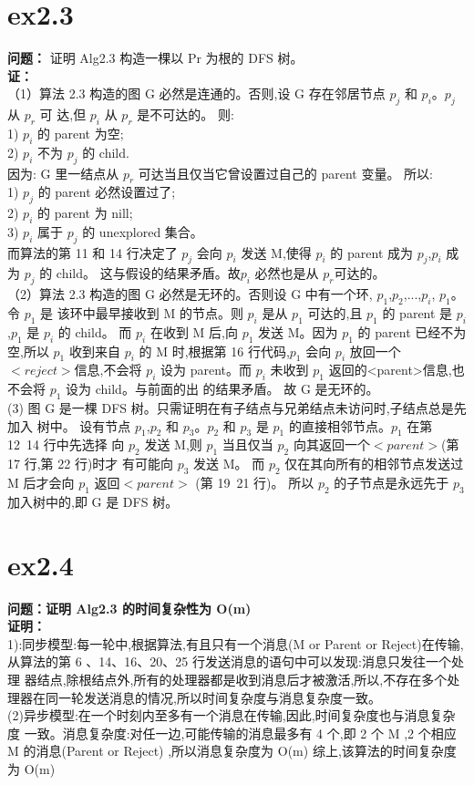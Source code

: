 \documentclass[10pt, a4paper]{article}
\begin{document}
\section{ex2.3}
\textbf{问题：}
证明 Alg2.3 构造一棵以 Pr 为根的 DFS 树。\\
\textbf{证：}\\
（1）算法 2.3 构造的图 G 必然是连通的。否则,设 G 存在邻居节点 $p_{j}$ 和 $p_{i}$。$p_{j}$ 从 $p_{r}$ 可
达,但 $p_{i}$ 从 $p_{r}$ 是不可达的。
则:\\
1) $p_{i}$ 的 parent 为空;\\
2) $p_{i}$ 不为 $p_{j}$ 的 child.\\
因为:
G 里一结点从 $p_{r}$ 可达当且仅当它曾设置过自己的 parent 变量。
所以:\\
1) $p_{j}$ 的 parent 必然设置过了;\\
2) $p_{i}$ 的 parent 为 nill;\\
3) $p_{i}$ 属于 $p_{j}$ 的 unexplored 集合。\\
而算法的第 11 和 14 行决定了 $p_{j}$ 会向 $p_{i}$ 发送 M,使得 $p_{i}$ 的 parent 成为 $p_{j}$,$p_{i}$ 成为 $p_{j}$
的 child。
这与假设的结果矛盾。故$p_{i}$ 必然也是从 $p_{r}$可达的。\\
（2）算法 2.3 构造的图 G 必然是无环的。否则设 G 中有一个环, $p_{1}$,$p_{2}$,...,$p_{i}$, $p_{1}$。令 $p_{1}$ 是
该环中最早接收到 M 的节点。则 $p_{i}$ 是从 $p_{1}$ 可达的,且 $p_{1}$ 的 parent 是 $p_{i}$,$p_{1}$ 是 $p_{i}$
的 child。
而 $p_{i}$ 在收到 M 后,向 $p_{1}$ 发送 M。因为 $p_{1}$ 的 parent 已经不为空,所以 $p_{1}$ 收到来自
$p_{i}$ 的 M 时,根据第 16 行代码,$p_{1}$ 会向 $p_{i}$ 放回一个$<reject>$信息,不会将 $p_{i}$ 设为
parent。而 $p_{i}$ 未收到 $p_{1}$ 返回的<parent>信息,也不会将 $p_{1}$ 设为 child。与前面的出
的结果矛盾。
故 G 是无环的。\\
(3) 图 G 是一棵 DFS 树。只需证明在有子结点与兄弟结点未访问时,子结点总是先加入
树中。
设有节点 $p_{1}$,$p_{2}$ 和 $p_{3}$。$p_{2}$ 和 $p_{3}$ 是 $p_{1}$ 的直接相邻节点。$p_{1}$ 在第 12~14 行中先选择
向 $p_{2}$ 发送 M,则 $p_{1}$ 当且仅当 $p_{2}$ 向其返回一个$<parent>$(第 17 行,第 22 行)时才
有可能向 $p_{3}$ 发送 M。
而 $p_{2}$ 仅在其向所有的相邻节点发送过 M 后才会向 $p_{1}$ 返回$<parent>$ (第 19~21 行)。
所以 $p_{2}$ 的子节点是永远先于 $p_{3}$ 加入树中的,即 G 是 DFS 树。
\section{ex2.4}
\textbf{问题：证明 Alg2.3 的时间复杂性为 O(m)}\\
\textbf{证明：}\\
1):同步模型:每一轮中,根据算法,有且只有一个消息(M or Parent or Reject)在传输,
从算法的第 6 、14、16、20、25 行发送消息的语句中可以发现:消息只发往一个处理
器结点,除根结点外,所有的处理器都是收到消息后才被激活,所以,不存在多个处
理器在同一轮发送消息的情况,所以时间复杂度与消息复杂度一致。\\
(2)异步模型:在一个时刻内至多有一个消息在传输,因此,时间复杂度也与消息复杂度
一致。消息复杂度:对任一边,可能传输的消息最多有 4 个,即 2 个 M ,2 个相应 M
的消息(Parent or Reject)
,所以消息复杂度为 O(m)
综上,该算法的时间复杂度为 O(m)
\end{document}
